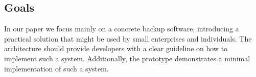 \subsection{Goals}
In our paper we focus mainly on a concrete backup software, introducing a practical solution that might be used by small enterprises and individuals. The architecture should provide developers with a clear guideline on how to implement such a system. Additionally, the prototype demonstrates a minimal implementation of such a system.
